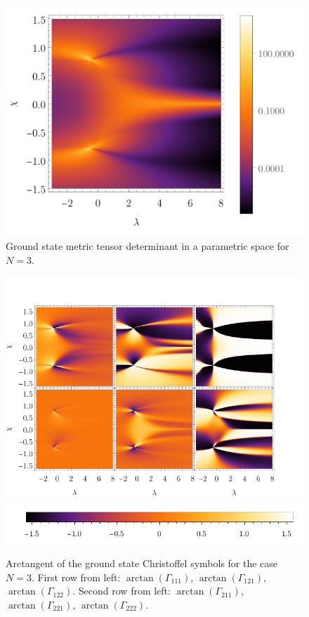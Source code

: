 \begin{figure}[H]
    \centering
    \includegraphics[scale=1.3]{../img/N=3_gDivergence.pdf}
    \caption{Ground state metric tensor determinant in a parametric space for $N=3$.}
    \label{fig:N=3_gDivenrgence}    
\end{figure}

\vspace{-40pt}
\begin{figure}[H]
    \centering
    \includegraphics[scale=1.3]{../img/N=3_gammas.pdf}    
    \includegraphics[scale=1.3]{../img/N=3_barA.pdf}
    \caption{Arctangent of the ground state Christoffel symbols for the case $N=3$. First row from left: $\arctan(\Gamma_{111})$, $\arctan(\Gamma_{121})$, $\arctan(\Gamma_{122})$. Second row from left: $\arctan(\Gamma_{211})$, $\arctan(\Gamma_{221})$, $\arctan(\Gamma_{222})$.}
    \label{fig:N=3_G}
\end{figure}


